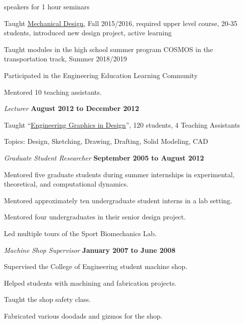 \documentclass[10pt]{article}
\newenvironment{outerlist}[1][\enskip\textbullet]%
        {\begin{itemize}[#1]}{\end{itemize}%
         \vspace{-.6\baselineskip}}
\newenvironment{innerlist}[1][\enskip\textbullet]%
        {\begin{compactitem}[#1]}{\end{compactitem}}
\begin{document}
\begin{outerlist}
\begin{innerlist}
        speakers for 1 hour seminars
      \item Taught
      \href{http://moorepants.github.io/eme150a}{Mechanical
      Design}, Fall 2015/2016, required upper level course, 20-35 students,
      introduced new design project, active learning
      \item Taught modules in the high school summer program COSMOS in the
        transportation track, Summer 2018/2019
      \item Participated in the Engineering Education Learning Community
      \item Mentored 10 teaching assistants.
    \end{innerlist}
  \item[] \textit{Lecturer}%
        \hfill \textbf{August 2012 to December 2012}
  \begin{innerlist}
  \item Taught
    ``\href{http://mae.ucdavis.edu/~biosport/jkm/courses/eng4/}{Engineering
    Graphics in Design}'', 120 students, 4 Teaching Assistants
    \item Topics: Design, Sketching, Drawing, Drafting, Solid Modeling, CAD
  \end{innerlist}
  \item[] \textit{Graduate Student Researcher}%
        \hfill \textbf{September 2005 to August 2012}
  \begin{innerlist}
    \item Mentored five graduate students during summer internships in
      experimental, theoretical, and computational dynamics.
    \item Mentored approximately ten undergraduate student interns in a lab
      setting.
    \item Mentored four undergraduates in their senior design project.
    \item Led multiple tours of the Sport Biomechanics Lab.
  \end{innerlist}
  \item[] \textit{Machine Shop Supervisor}%
    \hfill \textbf{January 2007 to June 2008}
  \begin{innerlist}
    \item Supervised the College of Engineering student machine shop.
    \item Helped students with machining and fabrication projects.
    \item Taught the shop safety class.
    \item Fabricated various doodads and gizmos for the shop.

\end{innerlist}
\end{outerlist}
\end{document}
